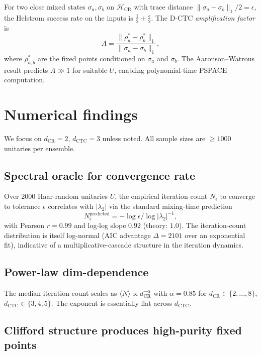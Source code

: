 \documentclass[11pt,a4paper]{article}
\begin{document}
For two close mixed states $\sigma_a, \sigma_b$ on
$\mathcal{H}_{\text{CR}}$ with trace distance
$\|\sigma_a - \sigma_b\|_1/2 = \epsilon$, the Helstrom success rate
on the inputs is $\tfrac{1}{2} + \tfrac{\epsilon}{2}$. The D-CTC
\emph{amplification factor} is
\begin{equation}
A = \frac{\|\rho_a^* - \rho_b^*\|_1}{\|\sigma_a - \sigma_b\|_1},
\end{equation}
where $\rho_{a,b}^*$ are the fixed points conditioned on $\sigma_a$
and $\sigma_b$. The Aaronson--Watrous result predicts $A \gg 1$ for
suitable $U$, enabling polynomial-time PSPACE computation.

\section{Numerical findings}

We focus on $d_{\text{CR}} = 2$, $d_{\text{CTC}} = 3$ unless noted.
All sample sizes are $\ge 1000$ unitaries per ensemble.

\subsection{Spectral oracle for convergence rate}

Over 2000 Haar-random unitaries $U$, the empirical iteration count
$N_\epsilon$ to converge to tolerance $\epsilon$ correlates with
$|\lambda_2|$ via the standard mixing-time prediction
\begin{equation}
N_\epsilon^{\text{predicted}} = -\log\epsilon \big/ \log|\lambda_2|^{-1},
\end{equation}
with Pearson $r = 0.99$ and log-log slope $0.92$ (theory: $1.0$).
The iteration-count distribution is itself log-normal (AIC advantage
$\Delta = 2101$ over an exponential fit), indicative of a
multiplicative-cascade structure in the iteration dynamics.

\subsection{Power-law dim-dependence}

The median iteration count scales as
$\langle N \rangle \propto d_{\text{CR}}^{-\alpha}$ with $\alpha = 0.85$
for $d_{\text{CR}} \in \{2, ..., 8\}$, $d_{\text{CTC}} \in \{3, 4, 5\}$.
The exponent is essentially flat across $d_{\text{CTC}}$.

\subsection{Clifford structure produces high-purity fixed points}
\end{document}
